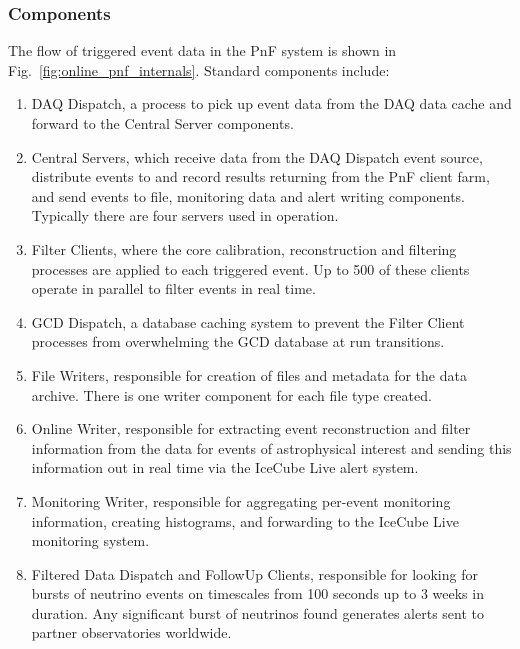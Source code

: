 \subsubsection{Components}

The flow of triggered event data in the PnF
system is shown in Fig.~\ref{fig:online_pnf_internals}.  Standard
components include: 
\begin{enumerate}
\item DAQ Dispatch, a process to pick up event data from the DAQ data cache
  and forward to the Central Server components. 
\item Central Servers, which
  receive data from the 
  DAQ Dispatch event source, distribute events to and record results
  returning from the PnF client farm, and send events to file,
  monitoring data and
  alert writing components.  Typically there are four servers used in
  operation.
\item Filter Clients, where the core calibration, reconstruction and
  filtering processes are applied to each triggered event.  Up to 500 of
  these clients operate in parallel to filter 
  events in real time.
\item GCD Dispatch, a database caching system to prevent the
  Filter Client processes from overwhelming the GCD database at run transitions.
\item File Writers, responsible for creation of files and metadata for
  the data archive.  There is one writer component for each file type created.
\item Online Writer, responsible for extracting event reconstruction and
  filter information from the data for events of astrophysical interest and
  sending this information out in real time via the IceCube Live alert
  system.
\item Monitoring Writer, responsible for aggregating per-event monitoring
  information, creating histograms, and forwarding to the IceCube Live
  monitoring system.
\item Filtered Data Dispatch and FollowUp Clients, responsible for
  looking for bursts of neutrino events on timescales from 100 seconds up
  to 3 weeks in duration.  Any significant burst of neutrinos found generates alerts
  sent to partner observatories worldwide.
\end{enumerate}

